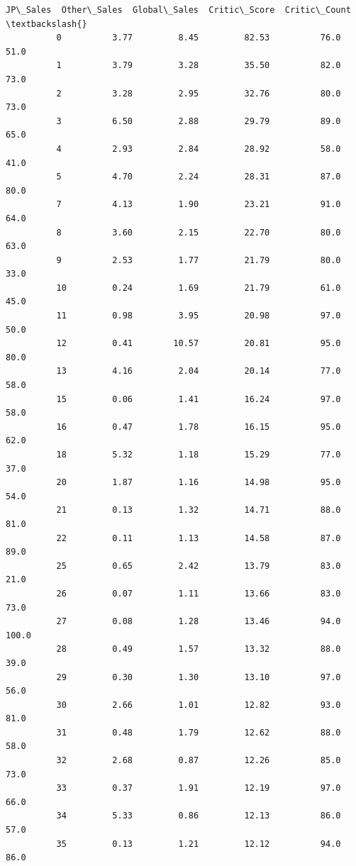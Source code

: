 \documentclass[11pt]{article}
\begin{document}
\begin{Verbatim}[commandchars=\\\{\}]
                 JP\_Sales  Other\_Sales  Global\_Sales  Critic\_Score  Critic\_Count  \textbackslash{}
          0          3.77         8.45         82.53          76.0          51.0   
          1          3.79         3.28         35.50          82.0          73.0   
          2          3.28         2.95         32.76          80.0          73.0   
          3          6.50         2.88         29.79          89.0          65.0   
          4          2.93         2.84         28.92          58.0          41.0   
          5          4.70         2.24         28.31          87.0          80.0   
          7          4.13         1.90         23.21          91.0          64.0   
          8          3.60         2.15         22.70          80.0          63.0   
          9          2.53         1.77         21.79          80.0          33.0   
          10         0.24         1.69         21.79          61.0          45.0   
          11         0.98         3.95         20.98          97.0          50.0   
          12         0.41        10.57         20.81          95.0          80.0   
          13         4.16         2.04         20.14          77.0          58.0   
          15         0.06         1.41         16.24          97.0          58.0   
          16         0.47         1.78         16.15          95.0          62.0   
          18         5.32         1.18         15.29          77.0          37.0   
          20         1.87         1.16         14.98          95.0          54.0   
          21         0.13         1.32         14.71          88.0          81.0   
          22         0.11         1.13         14.58          87.0          89.0   
          25         0.65         2.42         13.79          83.0          21.0   
          26         0.07         1.11         13.66          83.0          73.0   
          27         0.08         1.28         13.46          94.0         100.0   
          28         0.49         1.57         13.32          88.0          39.0   
          29         0.30         1.30         13.10          97.0          56.0   
          30         2.66         1.01         12.82          93.0          81.0   
          31         0.48         1.79         12.62          88.0          58.0   
          32         2.68         0.87         12.26          85.0          73.0   
          33         0.37         1.91         12.19          97.0          66.0   
          34         5.33         0.86         12.13          86.0          57.0   
          35         0.13         1.21         12.12          94.0          86.0   

\end{Verbatim}
\end{document}
